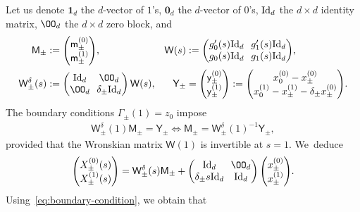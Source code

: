 \documentclass[JEP,XML,SOM,Unicode,NoFloatCountersInSection,published]{cedram}
\theoremstyle{definition}
\newcommand{\sW}{{\mathsf W}}
\newcommand{\I}{\textup{Id}}\let\Id\I
\newcommand{\U}{\mathbf{1}}
\newcommand{\V}{\mathbf{0}}
\begin{document}
Let us denote $\U_d$ the $d$-vector of $1$'s, $\V_d$ the
$d$-vector of $0$'s, $\I_d$ the $d\times d$ identity matrix,
$\OO_d$ the $d\times d$ zero block, and
\begin{align*}
\mathsf M_\pm &:=\arraycolsep3.5pt
\begin{pmatrix}
\mathsf m^{(0)}_\pm \\
\mathsf m^{(1)} _\pm
\end{pmatrix}\!, &
\sW(s) &:=\arraycolsep3.5pt
\begin{pmatrix}
g_0'(s) \I_d & g_1 '(s) \I_d \\
g_0(s) \I_d & g_1(s) \I_d
\end{pmatrix}\!, \\
\sW_\pm ^\delta (s) &:=\arraycolsep3.5pt
\begin{pmatrix}
\I_d & \OO_d \\
\OO_d & \delta_\pm \I_d
\end{pmatrix} \sW(s), &
\mathsf Y_\pm &=\arraycolsep3.5pt
\begin{pmatrix}
\mathsf y^{(0)} _\pm \\
\mathsf y^{(1)} _\pm
\end{pmatrix}
:=
\begin{pmatrix}
x^{(0)}_0 - x^{(0)}_\pm \\
x^{(1)}_0 - x^{(1)}_\pm - \delta_\pm x^{(0)}_\pm
\end{pmatrix}\!.
\end{align*}
The boundary conditions $\Gamma_\pm(1)=z_0$ impose
\begin{align}\label{eq:boundary-condition}
\sW_\pm ^\delta(1) \mathsf M_\pm = \mathsf Y_\pm \iff
\mathsf M_\pm = \sW_\pm ^\delta(1)^{-1} \mathsf Y_\pm,
\end{align}
provided that the Wronskian matrix $\sW(1)$ is invertible at
$s=1$. We~deduce
\begin{align*}\arraycolsep3.5pt
\begin{pmatrix}
X^{(0)}_\pm (s) \\
X^{(1)}_\pm (s)
\end{pmatrix}
= \sW_\pm ^\delta(s) \mathsf M_\pm +
\begin{pmatrix}
\I_d & \OO_d \\
\delta_\pm s \I_d & \I_d
\end{pmatrix}
\begin{pmatrix}
x_\pm^{(0)}\\
x_\pm^{(1)}
\end{pmatrix}\!.
\end{align*}
Using~\eqref{eq:boundary-condition}, we obtain that
\end{document}
